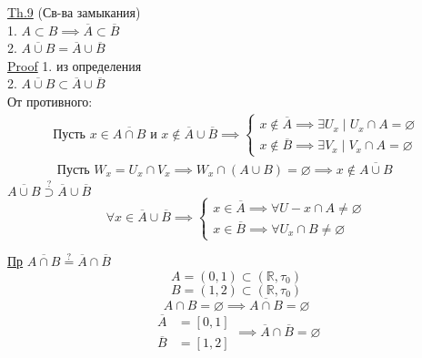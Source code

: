 \documentclass[a4paper]{article}
\begin{document}
\begin{tcolorbox}
    \underline{Th.9} (Св-ва замыкания)\\
    1. $ A \subset B \implies \overline{A} \subset \overline{B} $ \\
    2. $ \overline{A\cup B} = \overline{A} \cup \overline{B} $ \\
    \underline{Proof} 1. из определения\\
    2. $  \overline{A\cup B} \subset \overline{A} \cup \overline{B} $ \\
    От противного:\\
    \begin{equation*}
        \begin{aligned}
        \text{Пусть } x\in \overline{A\cap B} \text{ и } x \notin \overline{A}
        \cup \overline{B} \implies \begin{cases}
            x \notin \overline{A} \implies \exists U_x \; | \; U_x \cap A = \varnothing \\
            x \notin \overline{B}\implies \exists V_x \; | \; V_x \cap A = \varnothing 
        \end{cases}\\
        \text{ Пусть } W_x = U_x \cap V_x \implies W_x \cap (A \cup B) = \varnothing
        \implies x\notin \overline{A \cup B}
        \end{aligned}
    \end{equation*}
    $ \overline{A \cup B} \stackrel{?}{\supset} \overline{A} \cup \overline{B} $ 
    \[
        \forall x \in \overline{A} \cup \overline{B} \implies \begin{cases}
            x \in \overline{A} \implies \forall U-x \cap A \neq \varnothing \\
            x \in \overline{B} \implies \forall U_x \cap B \neq \varnothing
        \end{cases}
    \]
\end{tcolorbox}

\underline{Пр} $ \overline{A\cap B} \stackrel{?}{=} \overline{A} \cap \overline{B} $ \\
\[
    A= (0, 1) \subset (\mathbb{R}, \tau_0)
\]
\[
    B = (1, 2) \subset (\mathbb{R}, \tau_0)
\]
\[
    A\cap B = \varnothing \implies \overline{A\cap B} = \varnothing
\]
\begin{equation*}
    \begin{aligned}
        \overline{A} &= [0,1]\\
        \overline{B} &= [1,2]
    \end{aligned}
    \implies \overline{A} \cap \overline{B} = \varnothing
\end{equation*}
\end{document}
